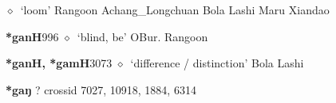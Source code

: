 \begin{list}{}{\leftmargin=1.5em \itemindent=-1.5em}
\hspace{1ex}
         $\diamond$~`loom'
         Rangoon 
\hspace{1ex}
         Achang\_Longchuan 
\hspace{1ex}
         Bola 
\hspace{1ex}
         Lashi 
\hspace{1ex}
         Maru 
\hspace{1ex}
         Xiandao 
  \item {\footnotesize \textbf{*ganH}}{\tiny 996}
\hspace{1ex}
         $\diamond$~`blind, be'
         OBur. 
\hspace{1ex}
         Rangoon 
  \item {\footnotesize \textbf{*ganH, *gamH}}{\tiny 3073}
\hspace{1ex}
         $\diamond$~`difference / distinction'
         Bola 
\hspace{1ex}
         Lashi 
  \end{list}
\item
\textbf{*gaŋ}
?
  {\tiny crossid 7027, 10918, 1884, 6314}
